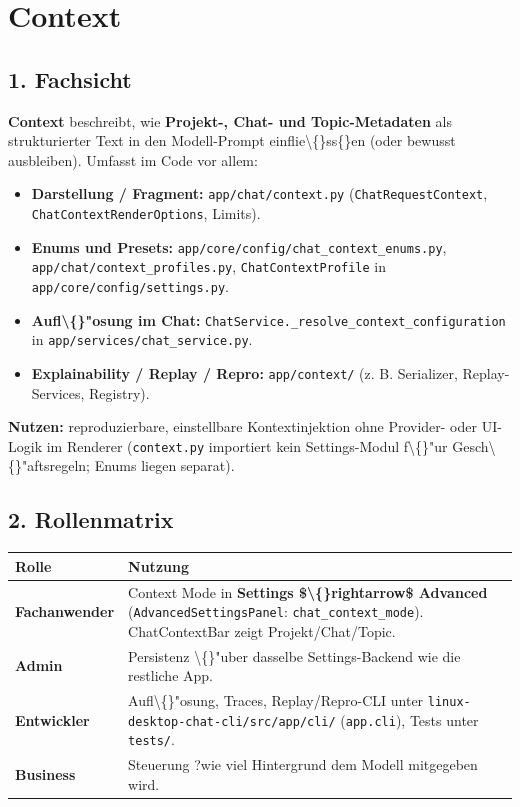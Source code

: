 \section{Context}

\subsection{1. Fachsicht}

\textbf{Context} beschreibt, wie \textbf{Projekt-, Chat- und Topic-Metadaten} als strukturierter Text in den Modell-Prompt einflie\textbackslash\{\}ss\{\}en (oder bewusst ausbleiben). Umfasst im Code vor allem:

\begin{itemize}
\item \textbf{Darstellung / Fragment:} \texttt{app/chat/context.py} (\texttt{ChatRequestContext}, \texttt{ChatContextRenderOptions}, Limits).
\item \textbf{Enums und Presets:} \texttt{app/core/config/chat\_context\_enums.py}, \texttt{app/chat/context\_profiles.py}, \texttt{ChatContextProfile} in \texttt{app/core/config/settings.py}.
\item \textbf{Aufl\textbackslash\{\}"osung im Chat:} \texttt{ChatService.\_resolve\_context\_configuration} in \texttt{app/services/chat\_service.py}.
\item \textbf{Explainability / Replay / Repro:} \texttt{app/context/} (z. B. Serializer, Replay-Services, Registry).
\end{itemize}

\textbf{Nutzen:} reproduzierbare, einstellbare Kontextinjektion ohne Provider- oder UI-Logik im Renderer (\texttt{context.py} importiert kein Settings-Modul f\textbackslash\{\}"ur Gesch\textbackslash\{\}"aftsregeln; Enums liegen separat).

\subsection{2. Rollenmatrix}

\begin{center}
\begin{tabular}{ll}
\hline
Rolle & Nutzung \\
\hline
\textbf{Fachanwender} & Context Mode in \textbf{Settings \$\textbackslash\{\}rightarrow\$ Advanced} (\texttt{AdvancedSettingsPanel}: \texttt{chat\_context\_mode}). ChatContextBar zeigt Projekt/Chat/Topic. \\
\textbf{Admin} & Persistenz \textbackslash\{\}"uber dasselbe Settings-Backend wie die restliche App. \\
\textbf{Entwickler} & Aufl\textbackslash\{\}"osung, Traces, Replay/Repro-CLI unter \texttt{linux-desktop-chat-cli/src/app/cli/} (\texttt{app.cli}), Tests unter \texttt{tests/}. \\
\textbf{Business} & Steuerung ?wie viel Hintergrund dem Modell mitgegeben wird\texttt{}. \\
\hline
\end{tabular}
\end{center}

